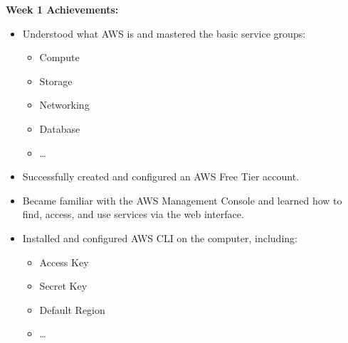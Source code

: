 \vspace{0.5em}\noindent\textbf{Week 1 Achievements:}\par

\begin{itemize}
\item
  Understood what AWS is and mastered the basic service groups:

  \begin{itemize}
  \tightlist
  \item
    Compute
  \item
    Storage
  \item
    Networking
  \item
    Database
  \item
    \ldots{}
  \end{itemize}
\item
  Successfully created and configured an AWS Free Tier account.
\item
  Became familiar with the AWS Management Console and learned how to
  find, access, and use services via the web interface.
\item
  Installed and configured AWS CLI on the computer, including:

  \begin{itemize}
  \tightlist
  \item
    Access Key
  \item
    Secret Key
  \item
    Default Region
  \item
    \ldots{}
  \end{itemize}
\end{itemize}

